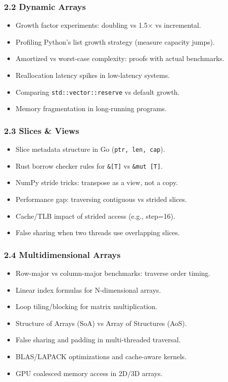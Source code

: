 \documentclass[
  letterpaper,
  DIV=11,
  numbers=noendperiod]{scrreprt}
\providecommand{\tightlist}{%
  \setlength{\itemsep}{0pt}\setlength{\parskip}{0pt}}
\begin{document}
\subsubsection{2.2 Dynamic Arrays}\label{dynamic-arrays-1}

\begin{itemize}
\tightlist
\item
  Growth factor experiments: doubling vs 1.5× vs incremental.
\item
  Profiling Python's list growth strategy (measure capacity jumps).
\item
  Amortized vs worst-case complexity: proofs with actual benchmarks.
\item
  Reallocation latency spikes in low-latency systems.
\item
  Comparing \texttt{std::vector::reserve} vs default growth.
\item
  Memory fragmentation in long-running programs.
\end{itemize}

\subsubsection{2.3 Slices \& Views}\label{slices-views-1}

\begin{itemize}
\tightlist
\item
  Slice metadata structure in Go (\texttt{ptr,\ len,\ cap}).
\item
  Rust borrow checker rules for \texttt{\&{[}T{]}} vs
  \texttt{\&mut\ {[}T{]}}.
\item
  NumPy stride tricks: transpose as a view, not a copy.
\item
  Performance gap: traversing contiguous vs strided slices.
\item
  Cache/TLB impact of strided access (e.g., step=16).
\item
  False sharing when two threads use overlapping slices.
\end{itemize}

\subsubsection{2.4 Multidimensional
Arrays}\label{multidimensional-arrays-1}

\begin{itemize}
\tightlist
\item
  Row-major vs column-major benchmarks: traverse order timing.
\item
  Linear index formulas for N-dimensional arrays.
\item
  Loop tiling/blocking for matrix multiplication.
\item
  Structure of Arrays (SoA) vs Array of Structures (AoS).
\item
  False sharing and padding in multi-threaded traversal.
\item
  BLAS/LAPACK optimizations and cache-aware kernels.
\item
  GPU coalesced memory access in 2D/3D arrays.
\end{itemize}
\end{document}
